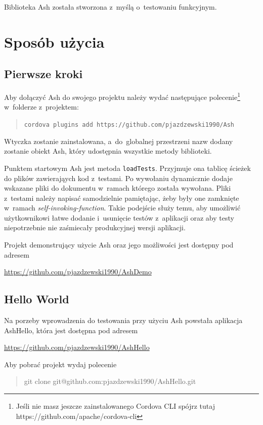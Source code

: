\documentclass[brudnopis]{xmgr}
\begin{document}
Biblioteka Ash została stworzona z~myślą o~testowaniu funkcyjnym.

\chapter{Sposób użycia}
\section{Pierwsze kroki}

Aby dołączyć Ash do swojego projektu należy wydać następujące polecenie\footnote{Jeśli nie masz jeszcze zainstalowanego Cordova CLI spójrz tutaj https://github.com/apache/cordova-cli} w~folderze z~projektem:
\begin{quote}
   \texttt{cordova plugins add https://github.com/pjazdzewski1990/Ash}
\end{quote}

Wtyczka zostanie zainstalowana, a~do~globalnej przestrzeni nazw dodany zostanie obiekt Ash, który udostępnia wszystkie metody biblioteki.

Punktem startowym Ash jest metoda \texttt{loadTests}. Przyjmuje ona tablicę ścieżek do plików zawierająych kod z~testami. Po wywołaniu dynamicznie dodaje wskazane pliki do dokumentu w~ramach którego została wywołana. Pliki z~testami należy napisać samodzielnie pamiętając, żeby były one zamknięte w~ramach \textit{self-invoking-function}. Takie podejście służy temu, aby umożliwić użytkownikowi łatwe dodanie i~usunięcie testów z~aplikacji oraz aby testy niepotrzebnie nie zaśmiecały produkcyjnej wersji aplikacji.

Projekt demonstrujący użycie Ash oraz jego możliwości jest dostępny pod adresem

\url{https://github.com/pjazdzewski1990/AshDemo}

\section{Hello World}

Na porzeby wprowadzenia do testowania przy użyciu Ash powstała aplikacja AshHello, która jest dostępna pod adresem 

\url{https://github.com/pjazdzewski1990/AshHello}

Aby pobrać projekt wydaj polecenie

\begin{quote}
   git clone git@github.com:pjazdzewski1990/AshHello.git
\end{quote}
\end{document}
